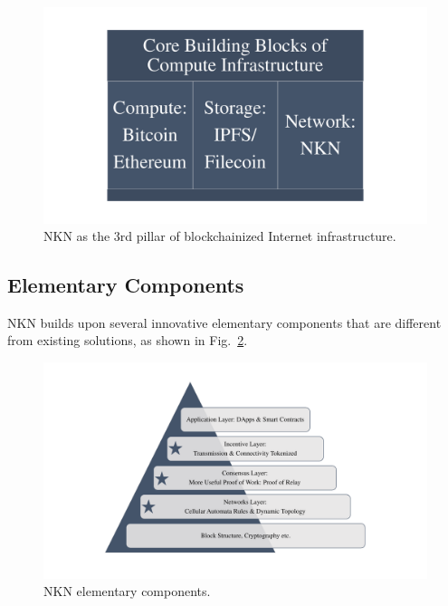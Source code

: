 \documentclass[reprint,pre,aps]{revtex4-1}
\begin{document}
\begin{figure}[!htp]
\centering
\includegraphics[width=0.6\linewidth]{fig/core_blocks_compute_infra}
\caption{NKN as the 3rd pillar of blockchainized Internet infrastructure.}
\label{fig:core_blocks_compute_infra}
\end{figure}

\subsection{Elementary Components}

NKN builds upon several innovative elementary components that are different from existing solutions, as shown in Fig.~\ref{fig:elementary_components}.

\begin{figure}[!htp]
\centering
\includegraphics[width=0.9\linewidth]{fig/elementary_components}
\caption{NKN elementary components.}
\label{fig:elementary_components}
\end{figure}
\end{document}
